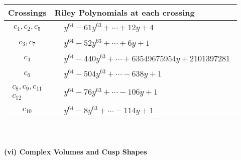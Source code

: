 \documentclass[1p]{elsarticle_modified}
\theoremstyle{definition}
\begin{document}
\begin{tabular}{m{50pt}|m{274pt}}
Crossings & \hspace{64pt}Riley Polynomials at each crossing \\
\hline $$\begin{aligned}c_{1},c_{2},c_{5}\end{aligned}$$&$\begin{aligned}
&y^{64}-61 y^{63}+\cdots+12 y+4
\end{aligned}$\\
\hline $$\begin{aligned}c_{3},c_{7}\end{aligned}$$&$\begin{aligned}
&y^{64}-52 y^{63}+\cdots+6 y+1
\end{aligned}$\\
\hline $$\begin{aligned}c_{4}\end{aligned}$$&$\begin{aligned}
&y^{64}-440 y^{63}+\cdots+63549675954 y+2101397281
\end{aligned}$\\
\hline $$\begin{aligned}c_{6}\end{aligned}$$&$\begin{aligned}
&y^{64}-504 y^{63}+\cdots-638 y+1
\end{aligned}$\\
\hline $$\begin{aligned}c_{8},c_{9},c_{11}\\c_{12}\end{aligned}$$&$\begin{aligned}
&y^{64}-76 y^{63}+\cdots-106 y+1
\end{aligned}$\\
\hline $$\begin{aligned}c_{10}\end{aligned}$$&$\begin{aligned}
&y^{64}-8 y^{63}+\cdots-114 y+1
\end{aligned}$\\
\hline
\end{tabular}\\~\\
\newpage\flushleft \textbf{(vi) Complex Volumes and Cusp Shapes}
\end{document}
